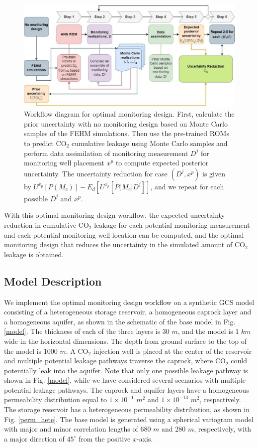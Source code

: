 \documentclass[a4paper,fleqn]{cas-sc}
\begin{document}
\begin{figure}
    \centering
    \includegraphics[width=16.5cm]{figs/Figure 4.pdf}
    \caption{Workflow diagram for optimal monitoring design. First, calculate the prior uncertainty with no monitoring design based on Monte Carlo samples of the FEHM simulations. Then use the pre-trained ROMs to predict CO$_2$ cumulative leakage using Monte Carlo samples and perform data assimilation of monitoring measurement $D^j$ for monitoring well placement $x^p$ to compute expected posterior uncertainty. The uncertainty reduction for case $(D^j,x^p)$ is given by $U^{x_p}[P(M_c)] - E_d[U^{x_p}[P(M_c \vert D^j]]$, and we repeat for each possible $D^j$ and $x^p$.}
    \label{opt_workflow}
\end{figure}

With this optimal monitoring design workflow, the expected uncertainty reduction in cumulative CO$_2$ leakage for each potential monitoring measurement and each potential monitoring well location can be computed, and the optimal monitoring design that reduces the uncertainty in the simulated amount of CO$_2$ leakage is obtained.

\subsection{Model Description}
We implement the optimal monitoring design workflow on a synthetic GCS model consisting of a heterogeneous storage reservoir, a homogeneous caprock layer and a homogeneous aquifer, as shown in the schematic of the base model in Fig. \ref{model}. The thickness of each of the three layers is $30$ $m$, and the model is $1$ $km$ wide in the horizontal dimensions. The depth from ground surface to the top of the model is $1000$ $m$. A CO$_2$ injection well is placed at the center of the reservoir and multiple potential leakage pathways traverse the caprock, where CO$_2$ could potentially leak into the aquifer. Note that only one possible leakage pathway is shown in Fig. \ref{model}, while we have considered several scenarios with multiple potential leakage pathways. The caprock and aquifer layers have a homogeneous permeability distribution equal to $1\times10^{-1}$ $m^2$ and $1\times10^{-13}$ $m^2$, respectively. The storage reservoir has a heterogeneous permeability distribution, as shown in Fig. \ref{perm_hete}. The base model is generated using a spherical variogram model \citep{Caers2005, Chen2017623} with major and minor correlation lengths of $680$ $m$ and $280$ $m$, respectively, with a major direction of $45^\circ$ from the positive $x$-axis.
\end{document}

